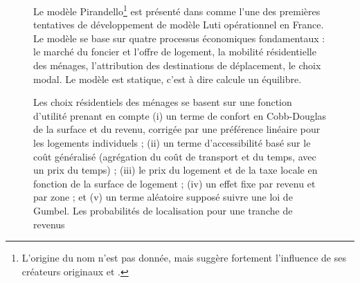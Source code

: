 \begin{figure}[h!]
	\begin{mdframed}
	
	Le modèle Pirandello\textregistered\footnote{L'origine du nom n'est pas donnée, mais suggère fortement l'influence de ses créateurs originaux  et .} est présenté dans \cite{delons:hal-00319087} comme l'une des premières tentatives de développement de modèle Luti opérationnel en France. Le modèle se base sur quatre processus économiques fondamentaux : le marché du foncier et l'offre de logement, la mobilité résidentielle des ménages, l'attribution des destinations de déplacement, le choix modal. Le modèle est statique, c'est à dire calcule un équilibre. 
	
	Les choix résidentiels des ménages se basent sur une fonction d'utilité prenant en compte (i) un terme de confort en Cobb-Douglas de la surface et du revenu, corrigée par une préférence linéaire pour les logements individuels ; (ii) un terme d'accessibilité basé sur le coût généralisé (agrégation du coût de transport et du temps, avec un prix du temps) ; (iii) le prix du logement et de la taxe locale en fonction de la surface de logement ; (iv) un effet fixe par revenu et par zone ; et (v) un terme aléatoire supposé suivre une loi de Gumbel. Les probabilités de localisation pour une tranche de revenus 
	
	
	\medskip
	
	
	\end{mdframed}
\end{figure}

	
	
